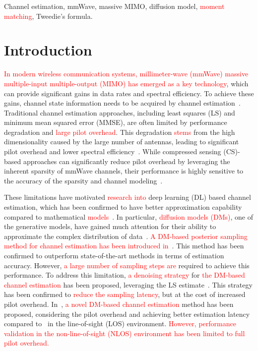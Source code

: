 \documentclass[lettersize,journal]{IEEEtran}
\newcommand{\tred}{\textcolor{red}}
\begin{document}
\begin{IEEEkeywords}
Channel estimation, mmWave, massive MIMO, diffusion model, \tred{moment matching}, Tweedie's formula.
\end{IEEEkeywords}


\section{Introduction}

\tred{In modern wireless communication systems, millimeter-wave (mmWave) massive multiple-input multiple-output (MIMO) has emerged as a key technology}, which can provide significant gains in data rates and spectral efficiency. To achieve these gains, channel state information needs to be acquired by channel estimation~\cite{busariMillimeterWaveMassiveMIMO2018}. Traditional channel estimation approaches, including least squares (LS) and minimum mean squared error (MMSE), are often limited by performance degradation and \tred{large pilot overhead}. This degradation \tred{stems} from the high dimensionality caused by the large number of antennas, leading to significant pilot overhead and lower spectral efficiency~\cite{hassibiHowMuchTraining2003}. While compressed sensing (CS)-based approaches can significantly reduce pilot overhead by leveraging the inherent sparsity of mmWave channels, their performance is highly sensitive to the accuracy of the sparsity and channel modeling~\cite{zhangAtomicNormDenoisingBased2018,mendez-rialHybridMIMOArchitectures2016,choiCompressedSensingWireless2017}.

These limitations have motivated \tred{research into} deep learning (DL) based channel estimation, which has been confirmed to have better approximation capability compared to mathematical \tred{models}~\cite{kimDeepLearningaidedWireless2023, heDeepLearningBasedChannel2018}. In particular, \tred{diffusion models (DMs)}, one of the generative models, have gained much attention for their ability to approximate the complex distribution of data~\cite{arvinteMIMOChannelEstimation2023,feslDiffusionBasedGenerativePrior2024,zhouGenerativeDiffusionModels2025}. \tred{A DM-based posterior sampling method for channel estimation has been introduced in}~\cite{arvinteMIMOChannelEstimation2023}. This method has been confirmed to outperform state-of-the-art methods in terms of estimation accuracy. However, \tred{a large number of sampling steps are} required to achieve this performance. To address this limitation, \tred{a denoising strategy} for \tred{the DM-based channel estimation} has been proposed, leveraging the LS estimate~\cite{feslDiffusionBasedGenerativePrior2024}. This strategy has been confirmed to \tred{reduce the sampling latency}, but at the cost of increased pilot overhead. In~\cite{zhouGenerativeDiffusionModels2025}, \tred{a novel DM-based channel estimation} method has been proposed, considering the pilot overhead and achieving better estimation latency compared to~\cite{arvinteMIMOChannelEstimation2023} in the line-of-sight (LOS) environment. \tred{However, performance validation in  the non-line-of-sight (NLOS) environment has been limited to full pilot overhead.}
\end{document}
